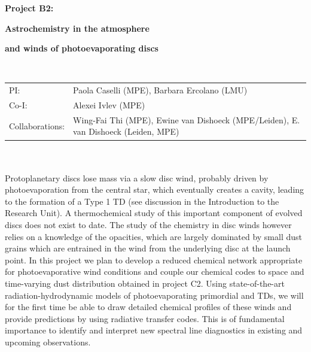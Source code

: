 \documentclass[10pt,fleqn,twoside]{article}
\newcommand{\Tcol}{\color{blue}}
\begin{document}
\newpage


\setcounter{page}{1}

\centerline{\huge\bf\Tcol
%
%
%
%
%
 Project B2:}

\centerline{\huge\bf\Tcol Astrochemistry in the atmosphere} 
\centerline{\huge\bf\Tcol and winds of photoevaporating discs}

%
%
%
%
%
\vskip1.0cm


\\
\begin{tabular}{ll}
{\textsf{PI:}}                   & Paola Caselli (MPE), Barbara Ercolano (LMU) \\
{\textsf{Co-I:}}                & Alexei Ivlev (MPE)\\
{\textsf{Collaborations:}}      &Wing-Fai Thi (MPE), Ewine van Dishoeck (MPE/Leiden),  E. van Dishoeck (Leiden, MPE)\\

\end{tabular}


\vspace{1em}
 \\

\vspace{1em}
\\

Protoplanetary discs lose mass via a slow disc wind, probably driven by photoevaporation from the central star, which eventually creates a cavity, leading to the formation of a Type 1 TD (see discussion in the Introduction to the Research Unit). A thermochemical study of this important component of evolved discs does not exist to date. The study of the chemistry in disc winds however relies on a knowledge of the opacities, which are largely dominated by small dust grains which are entrained in the wind from the underlying disc at the launch point. In this project we plan to develop a reduced chemical network appropriate for photoevaporative wind conditions and couple our chemical codes to space and time-varying dust distribution obtained in project C2. Using state-of-the-art radiation-hydrodynamic models of photoevaporating primordial and TDs, we will for the first time be able to draw detailed chemical profiles of these winds and provide predictions by using radiative transfer codes. This is of fundamental importance to identify and interpret new spectral line diagnostics in existing and upcoming observations. 
\end{document}
